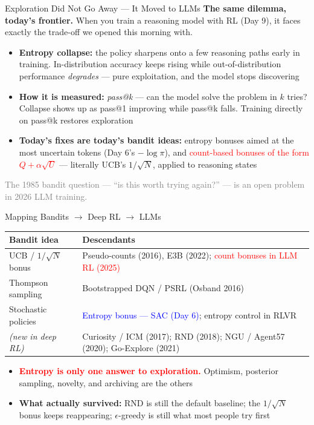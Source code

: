 \begin{frame}{Exploration Did Not Go Away --- It Moved to LLMs}
\textbf{The same dilemma, today's frontier.} When you train a reasoning model with RL (Day 9), it faces exactly the trade-off we opened this morning with.
\vspace{0.4em}
\begin{itemize}
    \setlength{\itemsep}{0.5em}
    \item \textbf{Entropy collapse:} the policy sharpens onto a few reasoning paths early in training. In-distribution accuracy keeps rising while out-of-distribution performance \emph{degrades} --- pure exploitation, and the model stops discovering
    \item \textbf{How it is measured:} \emph{pass@k} --- can the model solve the problem in $k$ tries? Collapse shows up as pass@1 improving while pass@k falls. Training directly on pass@k restores exploration
    \item \textbf{Today's fixes are today's bandit ideas:} entropy bonuses aimed at the most uncertain tokens (Day 6's $-\log\pi$), and \textcolor{red}{count-based bonuses of the form $Q + \alpha\sqrt{U}$} --- literally UCB's $1/\sqrt{N}$, applied to reasoning states
\end{itemize}
\vspace{0.3em}
\centering\small\textcolor{gray}{The 1985 bandit question --- ``is this worth trying again?'' --- is an open problem in 2026 LLM training.}
\end{frame}

\begin{frame}{Mapping Bandits $\longrightarrow$ Deep RL $\longrightarrow$ LLMs}
\begin{center}
\renewcommand{\arraystretch}{1.4}
\footnotesize
\begin{tabular}{p{}p{}}
\hline
\textbf{Bandit idea} & \textbf{Descendants} \\
\hline
UCB / $1/\sqrt{N}$ bonus & Pseudo-counts (2016), E3B (2022); \textcolor{red}{count bonuses in LLM RL (2025)} \\
Thompson sampling     & Bootstrapped DQN / PSRL (Osband 2016) \\
Stochastic policies   & \textcolor{blue}{Entropy bonus --- SAC (Day 6)}; entropy control in RLVR \\
\emph{(new in deep RL)} & Curiosity / ICM (2017); RND (2018); NGU / Agent57 (2020); Go-Explore (2021) \\
\hline
\end{tabular}
\end{center}
\vspace{0.5em}
\begin{itemize}
    \setlength{\itemsep}{0.45em}
    \item \textcolor{red}{\textbf{Entropy is only one answer to exploration.}} Optimism, posterior sampling, novelty, and archiving are the others
    \item \textbf{What actually survived:} RND is still the default baseline; the $1/\sqrt{N}$ bonus keeps reappearing; $\epsilon$-greedy is still what most people try first
\end{itemize}
\end{frame}
